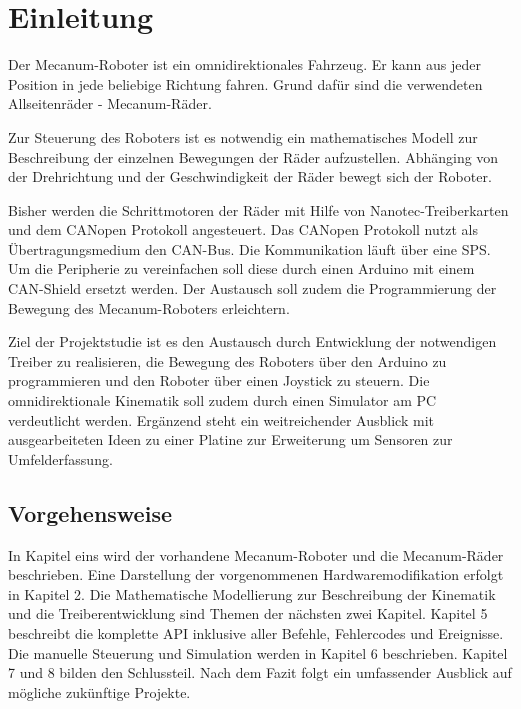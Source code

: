 
\section{Einleitung}

Der Mecanum-Roboter ist ein omnidirektionales Fahrzeug. Er kann aus jeder Position in jede beliebige Richtung fahren. Grund dafür sind die verwendeten Allseitenräder - Mecanum-Räder. 

Zur Steuerung des Roboters ist es notwendig ein mathematisches Modell zur Beschreibung der einzelnen Bewegungen der Räder aufzustellen. Abhänging von der Drehrichtung und der Geschwindigkeit der Räder bewegt sich der Roboter.

Bisher werden die Schrittmotoren der Räder mit Hilfe von Nanotec-Treiberkarten und dem CANopen Protokoll angesteuert. Das CANopen Protokoll nutzt als Übertragungsmedium den CAN-Bus. Die Kommunikation läuft über eine SPS. Um die Peripherie zu vereinfachen soll diese durch einen Arduino mit einem CAN-Shield ersetzt werden. Der Austausch soll zudem die Programmierung der Bewegung des Mecanum-Roboters erleichtern.

Ziel der Projektstudie ist es den Austausch durch Entwicklung der notwendigen Treiber zu realisieren, die Bewegung des Roboters über den Arduino zu programmieren und den Roboter über einen Joystick zu steuern. Die omnidirektionale Kinematik soll zudem durch einen Simulator am PC verdeutlicht werden. Ergänzend steht ein weitreichender Ausblick mit ausgearbeiteten Ideen zu einer Platine zur Erweiterung um Sensoren zur Umfelderfassung. 

\subsection*{Vorgehensweise}
In Kapitel eins wird der vorhandene Mecanum-Roboter und die Mecanum-Räder beschrieben. Eine Darstellung der vorgenommenen Hardwaremodifikation erfolgt in Kapitel 2. 
Die Mathematische Modellierung zur Beschreibung der Kinematik und die Treiberentwicklung sind Themen der nächsten zwei Kapitel. Kapitel 5 beschreibt die komplette API inklusive aller Befehle, Fehlercodes und Ereignisse. Die manuelle Steuerung und Simulation werden in Kapitel 6 beschrieben.
Kapitel 7 und 8 bilden den Schlussteil. Nach dem Fazit folgt ein umfassender Ausblick auf mögliche zukünftige Projekte.

